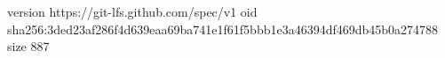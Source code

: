 version https://git-lfs.github.com/spec/v1
oid sha256:3ded23af286f4d639eaa69ba741e1f61f5bbb1e3a46394df469db45b0a274788
size 887
